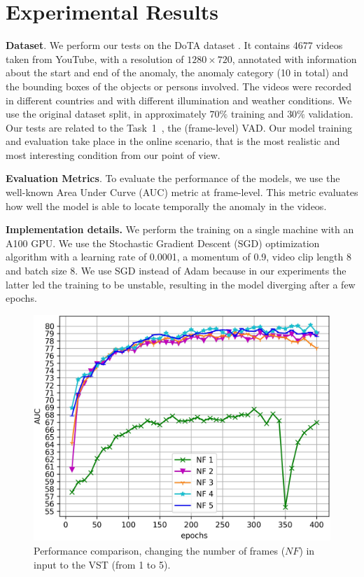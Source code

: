 \section{Experimental Results}
\label{sec:experiments}


\noindent\textbf{Dataset}.
We perform our tests on the DoTA dataset \cite{9712446}.
It contains 4677 videos taken from YouTube, with a resolution of $1280 \times 720$, annotated with information about the start and end of the anomaly, the anomaly category (10 in total) and the bounding boxes of the objects or persons involved.
The videos were recorded in different countries and with different illumination and weather conditions.
We use the original dataset split, in approximately $70\%$ training and $30\%$ validation.
Our tests are related to the Task~1~\cite{9712446}, the (frame-level) VAD.
Our model training and evaluation take place in the online scenario, that is the most realistic and most interesting condition from our point of view.

\noindent\textbf{Evaluation Metrics}.
To evaluate the performance of the models, we use the well-known Area Under Curve (AUC) metric at frame-level.
This metric evaluates how well the model is able to locate temporally the anomaly in the videos. 

\noindent\textbf{Implementation details.}
We perform the training on a single machine with an A100 GPU\@.
We use the Stochastic Gradient Descent (SGD) optimization algorithm with a learning rate of 0.0001, a momentum of 0.9, video clip length 8 and batch size 8.
We use SGD instead of Adam because in our experiments the latter led the training to be unstable, resulting in the model diverging after a few epochs.

\newcommand{\figsize}{0.7\columnwidth}

\begin{figure}[b!]
\centerline{\includegraphics[clip,width=\figsize]{images/exp_1.jpg}}
	\caption{Performance comparison, changing the number of frames ($\mathit{NF}$) in input to the VST  (from 1 to 5).}
	\label{fig:num-frames-vst}
\end{figure}


